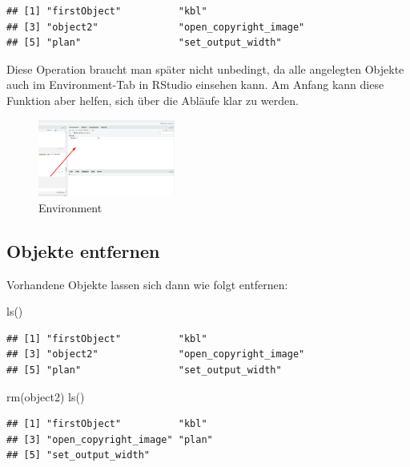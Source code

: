 \documentclass[
]{book}
\newenvironment{Shaded}{\begin{snugshade}}{\end{snugshade}}
\newcommand{\FunctionTok}[1]{\textcolor[rgb]{0.00,0.00,0.00}{#1}}
\newcommand{\NormalTok}[1]{#1}
\begin{document}
\begin{verbatim}
## [1] "firstObject"          "kbl"                 
## [3] "object2"              "open_copyright_image"
## [5] "plan"                 "set_output_width"
\end{verbatim}

Diese Operation braucht man später nicht unbedingt, da alle angelegten Objekte auch im Environment-Tab in RStudio einsehen kann. Am Anfang kann diese Funktion aber helfen, sich über die Abläufe klar zu werden.

\begin{figure}
\centering
\includegraphics[width=0.4\textwidth,height=\textheight]{imgs/environment.png}
\caption{Environment}
\end{figure}

\hypertarget{objekte-entfernen}{%
\subsection*{Objekte entfernen}\label{objekte-entfernen}}

Vorhandene Objekte lassen sich dann wie folgt entfernen:

\begin{Shaded}
\begin{Highlighting}[]
\FunctionTok{ls}\NormalTok{()}
\end{Highlighting}
\end{Shaded}

\begin{verbatim}
## [1] "firstObject"          "kbl"                 
## [3] "object2"              "open_copyright_image"
## [5] "plan"                 "set_output_width"
\end{verbatim}

\begin{Shaded}
\begin{Highlighting}[]
\FunctionTok{rm}\NormalTok{(object2)}
\FunctionTok{ls}\NormalTok{()}
\end{Highlighting}
\end{Shaded}

\begin{verbatim}
## [1] "firstObject"          "kbl"                 
## [3] "open_copyright_image" "plan"                
## [5] "set_output_width"
\end{verbatim}
\end{document}
